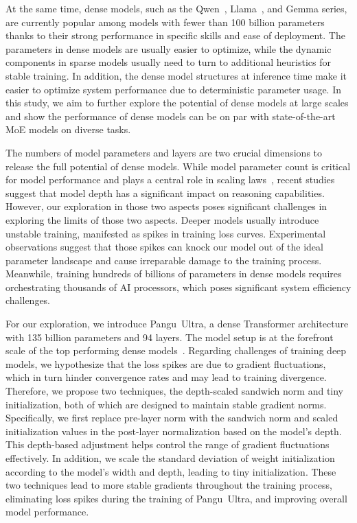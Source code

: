 \documentclass{article}
\newcommand{\pangu}{Pangu}
\newcommand{\modelname}{\pangu~Ultra}
\begin{document}
At the same time, dense models, such as the Qwen~\cite{bai2023qwen,yang2024qwen2}, Llama~\cite{grattafiori2024llama}, and Gemma \cite{team2024gemma} series, are currently popular among models with fewer than 100 billion parameters thanks to their strong performance in specific skills and ease of deployment. The parameters in dense models are usually easier to optimize, while the dynamic components in sparse models usually need to turn to additional heuristics for stable training.
In addition, the dense model structures at inference time make it easier to optimize system performance due to deterministic parameter usage. In this study, we aim to further explore the potential of dense models at large scales and show the performance of dense models can be on par with state-of-the-art MoE models on diverse tasks.

The numbers of model parameters and layers are two crucial dimensions to release the full potential of dense models. While model parameter count is critical for model performance and plays a central role in scaling laws~\cite{kaplan2020scaling}, recent studies~\cite{ye2024physics,merrill2025littledepth} suggest that model depth has a significant impact on reasoning capabilities. However, our exploration in those two aspects poses significant challenges in exploring the limits of those two aspects. Deeper models usually introduce unstable training, manifested as spikes in training loss curves. Experimental observations suggest that those spikes can knock our model out of the ideal parameter landscape and cause irreparable damage to the training process. Meanwhile, training hundreds of billions of parameters in dense models requires orchestrating thousands of AI processors, which poses significant system efficiency challenges.


For our exploration, we introduce \modelname, a dense Transformer architecture with 135 billion parameters and 94 layers. The model setup is at the forefront scale of the top performing dense models~\cite{bai2023qwen,yang2024qwen2,grattafiori2024llama,team2024gemma}. Regarding challenges of training deep models, we hypothesize that the loss spikes are due to gradient fluctuations, which in turn hinder convergence rates and may lead to training divergence. Therefore, we propose two techniques, the depth-scaled sandwich norm and tiny initialization, both of which are designed to maintain stable gradient norms. Specifically, we first replace pre-layer norm \cite{DBLP:conf/emnlp/LiuLGCH20} with the sandwich norm \cite{NEURIPS2021_CogView} and scaled initialization values in the post-layer normalization based on the model's depth. This depth-based adjustment helps control the range of gradient fluctuations effectively. In addition, we scale the standard deviation of weight initialization according to the model's width and depth, leading to tiny initialization. These two techniques lead to more stable gradients throughout the training process, eliminating loss spikes during the training of \modelname, and improving overall model performance.
\end{document}
